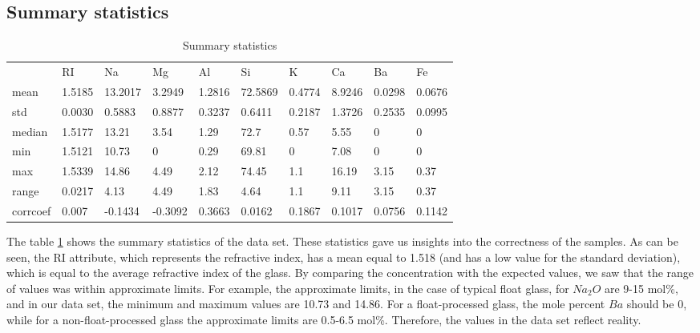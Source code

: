 \documentclass[12pt]{article}
\begin{document}
\subsection{Summary statistics} \label{statistics}
\begin{table}[H]
\begin{tabular}{llllllllll}
         & RI     & Na      & Mg      & Al     & Si      & K      & Ca     & Ba     & Fe     \\
mean     & 1.5185 & 13.2017 & 3.2949  & 1.2816 & 72.5869 & 0.4774 & 8.9246 & 0.0298 & 0.0676 \\
std      & 0.0030 & 0.5883  & 0.8877  & 0.3237 & 0.6411  & 0.2187 & 1.3726 & 0.2535 & 0.0995 \\
median   & 1.5177 & 13.21   & 3.54    & 1.29   & 72.7    & 0.57   & 5.55   & 0      & 0      \\
min      & 1.5121 & 10.73   & 0       & 0.29   & 69.81   & 0      & 7.08   & 0      & 0      \\
max      & 1.5339 & 14.86   & 4.49    & 2.12   & 74.45   & 1.1    & 16.19  & 3.15   & 0.37   \\
range    & 0.0217 & 4.13    & 4.49    & 1.83   & 4.64    & 1.1    & 9.11   & 3.15   & 0.37   \\
corrcoef & 0.007  & -0.1434 & -0.3092 & 0.3663 & 0.0162  & 0.1867 & 0.1017 & 0.0756 & 0.1142
\end{tabular}
\caption{Summary statistics}
\label{table:3}
\end{table}
The table \ref{table:3} shows the summary statistics of the data set. These statistics gave us insights into the correctness of the samples. As can be seen, the RI attribute, which represents the refractive index, has a mean equal to 1.518 (and has a low value for the standard deviation), which is equal to the average refractive index of the glass. By comparing the concentration with the expected values\cite{glass_composition}, we saw that the range of values was within approximate limits. For example, the approximate limits, in the case of typical float glass, for $Na_2O$ are 9-15 mol\%, and in our data set, the minimum and maximum values are 10.73 and 14.86. For a float-processed glass, the mole percent $Ba$ should be 0, while for a non-float-processed glass the approximate limits are 0.5-6.5 mol\%. Therefore, the values in the data set reflect reality.
\end{document}
